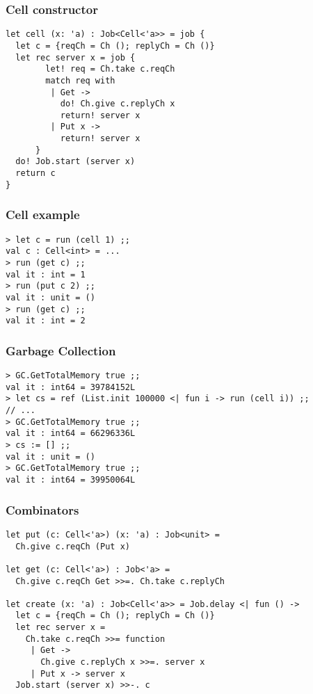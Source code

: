 \documentclass{beamer}
\begin{document}
    \begin{frame}[fragile]
        \frametitle{Cell constructor}
        \begin{verbatim}
let cell (x: 'a) : Job<Cell<'a>> = job {
  let c = {reqCh = Ch (); replyCh = Ch ()}
  let rec server x = job {
        let! req = Ch.take c.reqCh
        match req with
         | Get ->
           do! Ch.give c.replyCh x
           return! server x
         | Put x ->
           return! server x
      }
  do! Job.start (server x)
  return c
}
        \end{verbatim}
    \end{frame}

    \begin{frame}[fragile]
        \frametitle{Cell example}
        \begin{verbatim}
> let c = run (cell 1) ;;
val c : Cell<int> = ...
> run (get c) ;;
val it : int = 1
> run (put c 2) ;;
val it : unit = ()
> run (get c) ;;
val it : int = 2
        \end{verbatim}
    \end{frame}

    \begin{frame}[fragile]
        \frametitle{Garbage Collection}
        \begin{verbatim}
> GC.GetTotalMemory true ;;
val it : int64 = 39784152L
> let cs = ref (List.init 100000 <| fun i -> run (cell i)) ;;
// ...
> GC.GetTotalMemory true ;;
val it : int64 = 66296336L
> cs := [] ;;
val it : unit = ()
> GC.GetTotalMemory true ;;
val it : int64 = 39950064L
        \end{verbatim}
    \end{frame}

    \begin{frame}[fragile]
        \frametitle{Combinators}
        \begin{verbatim}
let put (c: Cell<'a>) (x: 'a) : Job<unit> =
  Ch.give c.reqCh (Put x)

let get (c: Cell<'a>) : Job<'a> = 
  Ch.give c.reqCh Get >>=. Ch.take c.replyCh

let create (x: 'a) : Job<Cell<'a>> = Job.delay <| fun () ->
  let c = {reqCh = Ch (); replyCh = Ch ()}
  let rec server x =
    Ch.take c.reqCh >>= function
     | Get ->
       Ch.give c.replyCh x >>=. server x
     | Put x -> server x       
  Job.start (server x) >>-. c
        \end{verbatim}
    \end{frame}
\end{document}
